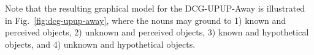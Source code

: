 %

Note that the resulting graphical model for the DCG-UPUP-Away is illustrated in Fig.~\ref{fig:dcg-upup-away}, where the nouns may ground to 1) known and perceived objects, 2) unknown and perceived objects, 3) known and hypothetical objects, and 4) unknown and hypothetical objects. 
